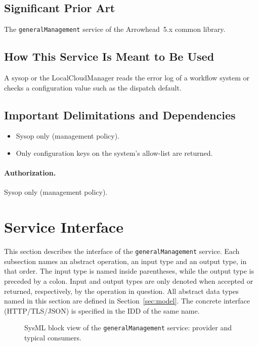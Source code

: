 \documentclass[a4paper]{arrowhead}
\begin{document}
\subsection{Significant Prior Art}
The \texttt{generalManagement} service of the Arrowhead~5.x common library.

\subsection{How This Service Is Meant to Be Used}
A sysop or the LocalCloudManager reads the error log of a workflow system or checks a configuration value
such as the dispatch default.

\subsection{Important Delimitations and Dependencies}
\label{sec:delimitations}
\begin{itemize}
\item Sysop only (management policy).
\item Only configuration keys on the system's allow-list are returned.
\end{itemize}

\paragraph{Authorization.} Sysop only (management policy).

\newpage
\section{Service Interface}
\label{sec:operations}
This section describes the interface of the \texttt{generalManagement} service. Each subsection names an abstract operation,
an input type and an output type, in that order. The input type is named inside parentheses, while the output type is
preceded by a colon. Input and output types are only denoted when accepted or returned, respectively, by the operation
in question. All abstract data types named in this section are defined in Section~\ref{sec:model}. The concrete
interface (HTTP/TLS/JSON) is specified in the IDD of the same name.

\begin{figure}[ht!]
  \centering
  \caption{SysML block view of the \texttt{generalManagement} service: provider and typical consumers.}
  \label{fig:SD}
\end{figure}
\end{document}
